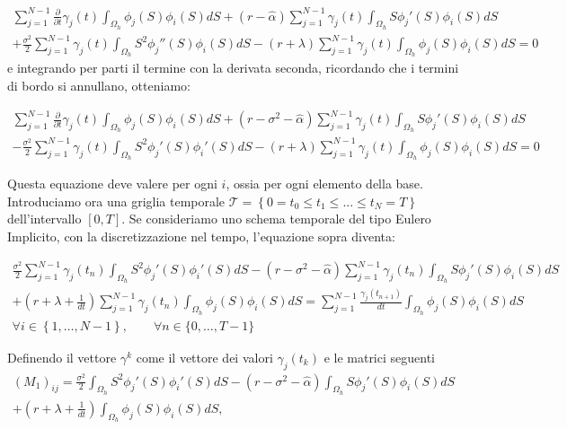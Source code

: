 \documentclass[a4paper,10pt]{report}
\theoremstyle{plain}
\theoremstyle{definition}
\theoremstyle{remark}
\begin{document}
\begin{multline*}
\sum_{j=1}^{N-1}\frac{\partial}{\partial t}\gamma_j(t)\int_{\Omega_h}\phi_j(S)\phi_i(S)dS+(r-\hat{\alpha})\sum_{j=1}^{N-1}\gamma_j(t)\int_{\Omega_h}S\phi_j'(S)\phi_i(S)dS\\
+\frac{\sigma^2}{2} \sum_{j=1}^{N-1} \gamma_j(t)\int_{\Omega_h} S^2 \phi_j''(S)\phi_i(S)dS -(r+\lambda) \sum_{j=1}^{N-1}\gamma_j(t)\int_{\Omega_h}\phi_j(S)\phi_i(S)dS=0
\end{multline*}
e integrando per parti il termine con la derivata seconda, ricordando che i termini di bordo si annullano, otteniamo:

\begin{multline*}
\sum_{j=1}^{N-1}\frac{\partial}{\partial t}\gamma_j(t)\int_{\Omega_h}\phi_j(S)\phi_i(S)dS
+(r-\sigma^2-\hat{\alpha})\sum_{j=1}^{N-1}\gamma_j(t)\int_{\Omega_h}S\phi_j'(S)\phi_i(S)dS\\
-\frac{\sigma^2}{2}\sum_{j=1}^{N-1} \gamma_j(t)\int_{\Omega_h} S^2\phi_j'(S)\phi_i'(S)dS
-(r+\lambda)\sum_{j=1}^{N-1}\gamma_j(t)\int_{\Omega_h}\phi_j(S)\phi_i(S)dS=0
\end{multline*}

Questa equazione deve valere per ogni $i$, ossia per ogni elemento della base.
Introduciamo ora una griglia temporale $\mathcal{T}=\left\{0= t_0\leq t_1\leq ... \leq t_N=T\right\}$ dell'intervallo $[0,T]$. Se consideriamo uno schema temporale del tipo Eulero Implicito, con la discretizzazione nel tempo, l'equazione sopra diventa:

\begin{multline}
\label{eq:discretizedPDEprice}\frac{\sigma^2}{2}\sum_{j=1}^{N-1} \gamma_j(t_n)\int_{\Omega_h} S^2\phi_j'(S)\phi_i'(S)dS
-(r-\sigma^2-\hat{\alpha})\sum_{j=1}^{N-1}\gamma_j(t_n)\int_{\Omega_h}S\phi_j'(S)\phi_i(S)dS\\
+\left(r+\lambda+\frac{1}{dt}\right)\sum_{j=1}^{N-1}\gamma_j(t_n)\int_{\Omega_h}\phi_j(S)\phi_i(S)dS=\sum_{j=1}^{N-1}\frac{\gamma_j(t_{n+1})}{dt}\int_{\Omega_h}\phi_j(S)\phi_i(S)dS \\ \forall i \in \left\lbrace 1,\dots,N-1 \right\rbrace, \qquad \forall n \in \lbrace0,\dots,T-1\rbrace
\end{multline}

Definendo il vettore  ${\gamma}^k$ come il vettore dei valori $\gamma_j(t_k)$ e le matrici seguenti
\begin{multline*}
 (M_1)_{ij}=\frac{\sigma^2}{2}\int_{\Omega_h}S^2\phi_j'(S)\phi_i'(S)dS-(r-\sigma^2-\hat{\alpha})\int_{\Omega_h}S\phi_j'(S)\phi_i(S)dS\\
 +\left(r+\lambda+\frac{1}{dt}\right)\int_{\Omega_h}\phi_j(S)\phi_i(S)dS,
\end{multline*}
\end{document}
